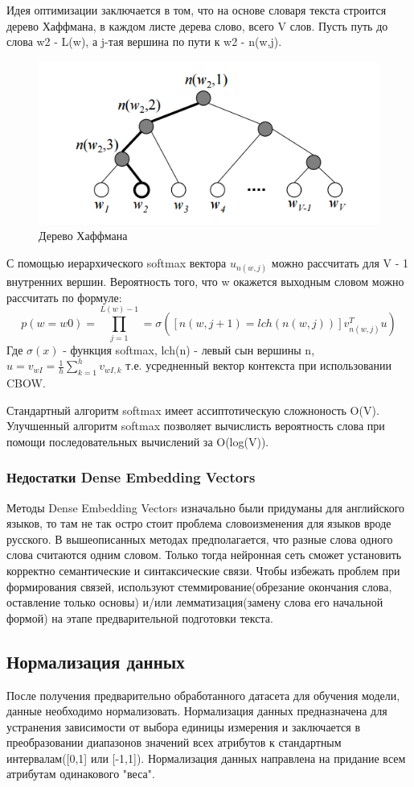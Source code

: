 Идея оптимизации заключается в том, что на основе словаря текста строится дерево Хаффмана, в каждом листе дерева слово, всего V слов. Пусть путь до слова w2 - L(w), а j-тая вершина по пути к w2 - n(w,j).
\begin{figure}[!h]
	\centering
	\includegraphics[width=.5\textwidth]{master_img/haffman.png}
	\caption{Дерево Хаффмана}
	\label{fig04_master}
\end{figure}
С помощью иерархического softmax вектора $u_{n(w,j)}$ можно рассчитать для V - 1 внутренних вершин.
Вероятность того, что w окажется выходным словом можно рассчитать по формуле:
\begin{equation}
p(w = w0) = \prod_{j=1}^{L(w) - 1} = \sigma([n(w,j + 1) = lch(n(w,j))]v^T_{n(w,j)}u)
\end{equation}
Где $\sigma(x)$ - функция softmax, lch(n) - левый сын вершины n, $u=v_{wI}=\frac{1}{h}\sum^h_{k=1}v_{wI,k}$ т.е. усредненный вектор контекста при использовании CBOW.

Стандартный алгоритм softmax имеет ассиптотическую сложноность O(V). Улучшенный алгоритм softmax позволяет вычислисть вероятность слова при помощи последовательных вычислений за O(log(V)).

\subsubsection{Недостатки Dense Embedding Vectors}
Методы Dense Embedding Vectors изначально были придуманы для английского языков, то там не так остро стоит проблема словоизменения для языков вроде русского.  В вышеописанных методах предполагается, что разные слова одного слова считаются одним словом. Только тогда нейронная сеть сможет установить корректно семантические и синтаксические связи. Чтобы избежать проблем при формирования связей, используют стеммирование(обрезание окончания слова, оставление только основы) и/или лемматизация(замену слова его начальной формой) 
 на этапе предварительной подготовки текста.
 
\subsection{Нормализация данных} 
После получения предварительно обработанного датасета для обучения модели, данные необходимо нормализовать. Нормализация данных предназначена для устранения зависимости от выбора единицы измерения и заключается в преобразовании диапазонов значений всех атрибутов к стандартным интервалам([0,1] или [-1,1])\cite{Book25}. Нормализация данных направлена на придание всем атрибутам одинакового "веса".

